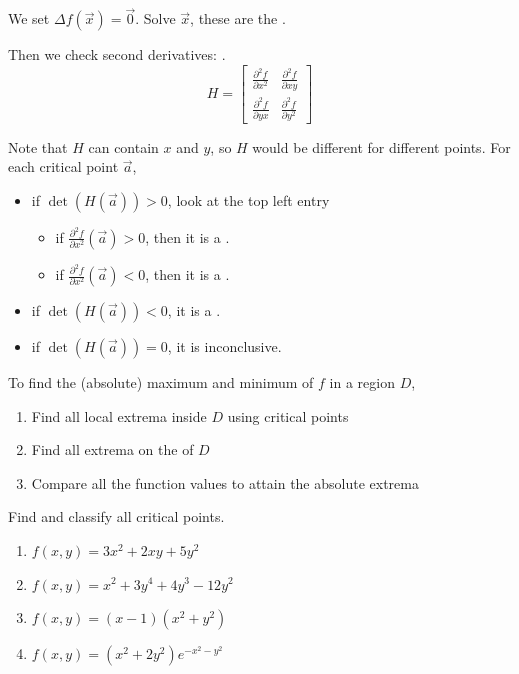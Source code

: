 \documentclass[11pt,fleqn]{book} %
\begin{document}
We set $\Delta f(\vec{x}) = \vec{0}$. Solve $\vec{x}$, these are the .

Then we check second derivatives: .
$$H = \begin{bmatrix}
    \frac{\partial^2 f}{\partial x^2} & \frac{\partial^2 f}{\partial xy}  \\
    \frac{\partial^2 f}{\partial yx}  & \frac{\partial^2 f}{\partial y^2}
\end{bmatrix}$$

Note that $H$ can contain $x$ and $y$, so $H$ would be different for different points. For each critical point $\vec{a}$, 
\begin{itemize}
    \item if $\det(H(\vec{a})) > 0$, look at the top left entry
    
    \begin{itemize}
        \item if $\frac{\partial^2 f}{\partial x^2}(\vec{a}) > 0$,  then it is a .
        \item if $\frac{\partial^2 f}{\partial x^2}(\vec{a}) < 0$,  then it is a .
    \end{itemize}

    \item if $\det(H(\vec{a})) < 0$, it is a . 

    \item if $\det(H(\vec{a})) = 0$, it is inconclusive. 
\end{itemize}

To find the (absolute) maximum and minimum of $f$ in a region $D$, 
\begin{enumerate}
    \item Find all local extrema inside $D$ using critical points
    \item Find all extrema on the  of $D$ 
    \item Compare all the function values to attain the absolute extrema
\end{enumerate}

\begin{exercise}
    Find and classify all critical points.

    \begin{enumerate}
        \item $f(x,y) = 3x^2 + 2xy + 5y^2$
        \item $f(x,y) = x^2 + 3y^4 + 4y^3 - 12y^2$
        \item $f(x,y) = (x - 1)(x^2 + y^2)$
        \item $f(x,y) = (x^2 + 2y^2)e^{-x^2 - y^2}$
    \end{enumerate}
\end{exercise}
\end{document}
